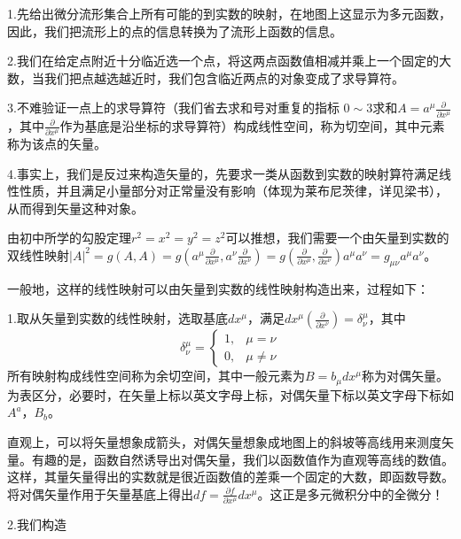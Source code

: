 \documentclass{article}
\begin{document}
1.先给出微分流形集合上所有可能的到实数的映射，在地图上这显示为多元函数，因此，我们把流形上的点的信息转换为了流形上函数的信息。

2.我们在给定点附近十分临近选一个点，将这两点函数值相减并乘上一个固定的大数，当我们把点越选越近时，我们包含临近两点的对象变成了求导算符。

3.不难验证一点上的求导算符（我们省去求和号对重复的指标 $ 0 \sim 3 $求和$A=a^\mu \frac{\partial}{\partial x^\mu }$，其中$\frac{\partial}{\partial x^\mu }$作为基底是沿坐标的求导算符）构成线性空间，称为切空间，其中元素称为该点的矢量。

4.事实上，我们是反过来构造矢量的，先要求一类从函数到实数的映射算符满足线性性质，并且满足小量部分对正常量没有影响（体现为莱布尼茨律，详见梁书），从而得到矢量这种对象。

由初中所学的勾股定理$r^2=x^2=y^2=z^2$可以推想，我们需要一个由矢量到实数的双线性映射$|A|^2=g(A,A)=g(a^\mu \frac{\partial}{\partial x^\mu },a^\nu \frac{\partial}{\partial x^\nu })=g( \frac{\partial}{\partial x^\mu }, \frac{\partial}{\partial x^\nu})a^\mu a^\nu=g_{\mu \nu }a^\mu a^\nu $。

一般地，这样的线性映射可以由矢量到实数的线性映射构造出来，过程如下：

1.取从矢量到实数的线性映射，选取基底$dx^\mu $，满足$dx^\mu (\frac{\partial}{\partial x^\nu })=\delta ^\mu _\nu$，其中
\begin{equation*}
    \delta ^\mu _\nu =
    \begin{cases}
    1,&\mu=\nu
    \\0,&\mu\neq \nu
\end{cases}
\end{equation*}
所有映射构成线性空间称为余切空间，其中一般元素为$B=b_\mu dx^\mu $称为对偶矢量。为表区分，必要时，在矢量上标以英文字母上标，对偶矢量下标以英文字母下标如$A^a$，$B_b$。

直观上，可以将矢量想象成箭头，对偶矢量想象成地图上的斜坡等高线用来测度矢量。有趣的是，函数自然诱导出对偶矢量，我们以函数值作为直观等高线的数值。这样，其量矢量得出的实数就是很近函数值的差乘一个固定的大数，即函数导数。将对偶矢量作用于矢量基底上得出$df=\frac{\partial f}{\partial x^\mu }dx^\mu $。这正是多元微积分中的全微分！

2.我们构造
\end{document}

